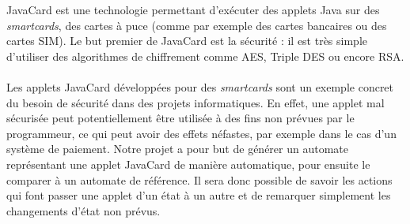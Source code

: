JavaCard est une technologie permettant d'exécuter des applets
Java sur des \textit{smartcards}, des cartes à puce (comme par exemple
des cartes bancaires ou des cartes SIM). Le but premier de JavaCard
est la sécurité : il est très simple d'utiliser des algorithmes de
chiffrement comme AES, Triple DES ou encore RSA.

\paragraph{}
Les applets JavaCard développées pour des \textit{smartcards} sont un
exemple concret du besoin de sécurité dans des projets
informatiques. En effet, une applet mal sécurisée peut potentiellement
être utilisée à des fins non prévues par le programmeur, ce qui peut
avoir des effets néfastes, par exemple dans le cas d'un système de
paiement. Notre projet a pour but de générer un automate représentant
une applet JavaCard de manière automatique, pour ensuite le comparer à
un automate de référence. Il sera donc possible de savoir les actions
qui font passer une applet d'un état à un autre et de remarquer
simplement les changements d'état non prévus.
